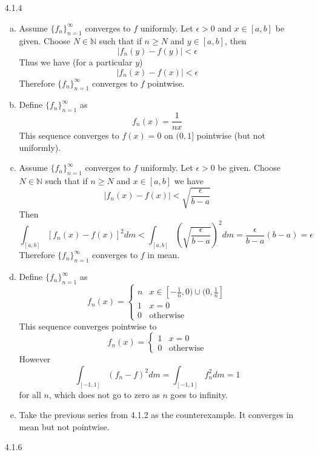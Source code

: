 \documentclass[../../Solutions.tex]{subfiles}
\begin{document}
\begin{itemize}
	\item [4.1.4]
	\begin{enumerate}[(a)]
		\item Assume $\{f_n\}_{n=1}^\infty$ converges to $f$ uniformly.
			Let $\epsilon > 0$ and $x \in [a,b]$ be given.
			Choose $N \in \mathbb{N}$ such that if $n \geq N$ and $y \in [a,b]$, then
			$$ |f_n(y)-f(y)| < \epsilon $$
			Thus we have (for a particular $y$)
			$$ |f_n(x)-f(x)| < \epsilon $$
			Therefore $\{f_n\}_{n=1}^\infty$ converges to $f$ pointwise.
		\item Define $\{f_n\}_{n=1}^\infty$ as
			$$ f_n(x) = \frac{1}{nx} $$
			This sequence converges to $f(x) = 0$ on $(0,1]$ pointwise (but not uniformly).
		\item Assume $\{f_n\}_{n=1}^\infty$ converges to $f$ uniformly.
			Let $\epsilon > 0$ be given.
			Choose $N \in \mathbb{N}$ such that if $n \geq N$ and $x \in [a,b]$ we have
			$$ |f_n(x)-f(x)| < \sqrt{\frac{\epsilon}{b-a}} $$
			Then
			$$ \int_{[a,b]} [f_n(x)-f(x)]^2 dm < \int_{[a,b]} \left(\sqrt{\frac{\epsilon}{b-a}}\right)^2 dm = \frac{\epsilon}{b-a}(b-a) = \epsilon $$
			Therefore $\{f_n\}_{n=1}^\infty$ converges to $f$ in mean.
		\item Define $\{f_n\}_{n=1}^\infty$ as
			\begin{equation*}
				f_n(x) = \begin{cases}
					n & x \in [-\frac{1}{n},0)\cup(0,\frac{1}{n}] \\
					1 & x = 0 \\
					0 & \text{otherwise}
				\end{cases}
			\end{equation*}
			This sequence converges pointwise to
			\begin{equation*}
				f_n(x) = \begin{cases}
					1 & x = 0 \\
					0 & \text{otherwise}
				\end{cases}
			\end{equation*}
			However
			\begin{equation*}
				\int_{[-1,1]} (f_n-f)^2 dm = \int_{[-1,1]} f_n^2 dm = 1
			\end{equation*}
			for all $n$, which does not go to zero as $n$ goes to infinity.
		\item Take the previous series from 4.1.2 as the counterexample.
			It converges in mean but not pointwise.
	\end{enumerate}
	
	\item [4.1.6]

\end{itemize}
\end{document}
